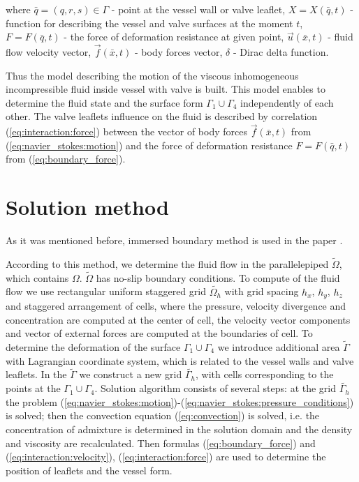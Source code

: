 \documentclass[conference]{IEEEtran}
\begin{document}
where $\bar{q} = (q, r, s) \in \Gamma$ - point at the vessel wall or valve leaflet, $X = X(\bar{q}, t)$ - function for describing the vessel
and valve surfaces at the moment $t$, $F = F(\bar{q}, t)$ - the force of deformation resistance at given point,
$\vec{u}(\bar{x}, t)$ - fluid flow velocity vector, $\vec{f}(\bar{x}, t)$ - body forces vector, $\delta$ - Dirac delta function.

Thus the model describing the motion of the viscous inhomogeneous incompressible fluid inside vessel with valve is built. This model enables to determine
the fluid state and the surface form $\Gamma_1 \cup \Gamma_4$ independently of each other. The valve leaflets influence on the fluid is described by 
correlation (\ref{eq:interaction:force}) between the vector of body forces $\vec{f}(\bar{x}, t)$ from (\ref{eq:navier_stokes:motion}) 
and the force of deformation resistance $F = F(\bar{q}, t)$ from (\ref{eq:boundary_force}).

\section{Solution method}
As it was mentioned before, immersed boundary method is used in the paper \cite{pescin_2002}.

According to this method, we determine the fluid flow in the parallelepiped $\tilde{\Omega}$, which contains $\Omega$.
$\tilde{\Omega}$ has no-slip boundary conditions.
To compute of the fluid flow we use rectangular uniform staggered grid $\tilde{\Omega_h}$ with grid spacing $h_x$, $h_y$, $h_z$ and 
staggered arrangement of cells, where the pressure, velocity divergence and concentration are computed at the center of cell, the velocity vector components
and vector of external forces are computed at the boundaries of cell. To determine the deformation of the surface
$\Gamma_1 \cup \Gamma_4$ we introduce additional area $\tilde{\Gamma}$ with Lagrangian coordinate system, which is related to the vessel
walls and valve leaflets. In the $\tilde{\Gamma}$ we construct a new grid $\tilde{\Gamma_h}$, with cells corresponding to the points at the $\Gamma_1 \cup \Gamma_4$.
Solution algorithm consists of several steps:
at the grid $\tilde{\Gamma_h}$ the problem (\ref{eq:navier_stokes:motion})-(\ref{eq:navier_stokes:pressure_conditions}) is solved; then the convection equation 
(\ref{eq:convection}) is solved, i.e. the concentration of admixture is determined in the solution domain and the density and viscosity are recalculated.
Then formulas (\ref{eq:boundary_force}) and (\ref{eq:interaction:velocity}), (\ref{eq:interaction:force}) are used to
determine the position of leaflets and the vessel form.
\end{document}
